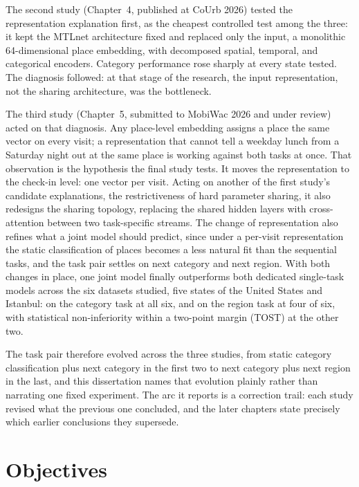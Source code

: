 The second study (Chapter~4, published at CoUrb 2026) tested the representation
explanation first, as the cheapest controlled test among the three: it kept the MTLnet
architecture fixed and replaced only the input, a monolithic 64-dimensional place
embedding, with decomposed spatial, temporal, and categorical encoders. Category
performance rose sharply at every state tested. The diagnosis followed: at that stage
of the research, the input representation, not the sharing architecture, was the
bottleneck.

The third study (Chapter~5, submitted to MobiWac 2026 and under review) acted on that
diagnosis. Any place-level embedding assigns a place the same vector on every visit; a
representation that cannot tell a weekday lunch from a Saturday night out at the same
place is working against both tasks at once. That observation is the hypothesis the
final study tests. It moves the representation to the check-in level: one vector per
visit. Acting on another of the first study's candidate explanations, the
restrictiveness of hard parameter sharing, it also redesigns the sharing topology,
replacing the shared hidden layers with cross-attention between two task-specific
streams. The change of representation also refines what a joint model should predict,
since under a per-visit representation the static classification of places becomes a
less natural fit than the sequential tasks, and the task pair settles on next category
and next region. With both changes in place, one joint model finally outperforms both
dedicated single-task models across the six datasets studied, five states of the
United States and Istanbul: on the category task at all six, and on the region task at
four of six, with statistical non-inferiority within a two-point margin (TOST) at the
other two.

The task pair therefore evolved across the three studies, from static category
classification plus next category in the first two to next category plus next region
in the last, and this dissertation names that evolution plainly rather than narrating
one fixed experiment. The arc it reports is a correction trail: each study revised
what the previous one concluded, and the later chapters state precisely which earlier
conclusions they supersede.

\section{Objectives}
\label{sec:intro:objectives}

